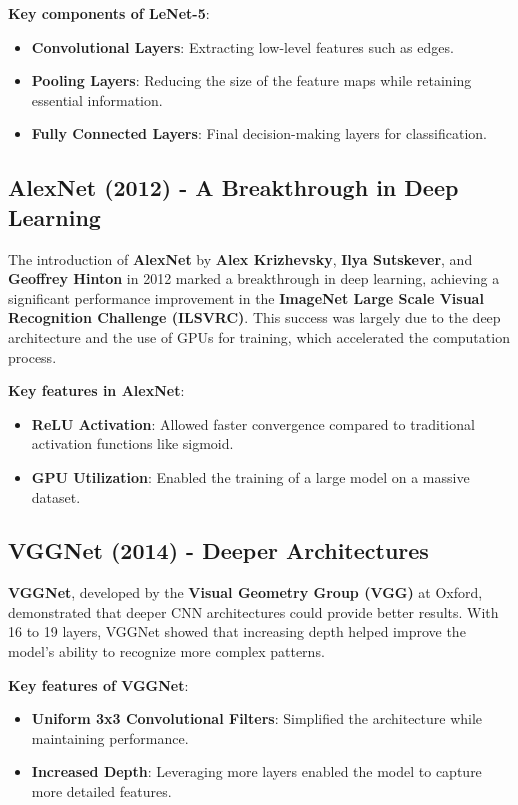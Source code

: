 \textbf{Key components of LeNet-5}:
\begin{itemize}
    \item \textbf{Convolutional Layers}: Extracting low-level features such as edges.
    \item \textbf{Pooling Layers}: Reducing the size of the feature maps while retaining essential information.
    \item \textbf{Fully Connected Layers}: Final decision-making layers for classification.
\end{itemize}

\subsection{AlexNet (2012) - A Breakthrough in Deep Learning}
The introduction of \textbf{AlexNet} by \textbf{Alex Krizhevsky}, \textbf{Ilya Sutskever}, and \textbf{Geoffrey Hinton} in 2012 marked a breakthrough in deep learning, achieving a significant performance improvement in the \textbf{ImageNet Large Scale Visual Recognition Challenge (ILSVRC)}. This success was largely due to the deep architecture and the use of GPUs for training, which accelerated the computation process.\cite{krizhevsky2012imagenet}

\textbf{Key features in AlexNet}:
\begin{itemize}
    \item \textbf{ReLU Activation}: Allowed faster convergence compared to traditional activation functions like sigmoid.
    \item \textbf{GPU Utilization}: Enabled the training of a large model on a massive dataset.
\end{itemize}

\subsection{VGGNet (2014) - Deeper Architectures}
\textbf{VGGNet}, developed by the \textbf{Visual Geometry Group (VGG)} at Oxford, demonstrated that deeper CNN architectures could provide better results. With 16 to 19 layers, VGGNet showed that increasing depth helped improve the model’s ability to recognize more complex patterns.\cite{simonyan2014very}

\textbf{Key features of VGGNet}:
\begin{itemize}
    \item \textbf{Uniform 3x3 Convolutional Filters}: Simplified the architecture while maintaining performance.
    \item \textbf{Increased Depth}: Leveraging more layers enabled the model to capture more detailed features.
\end{itemize}

